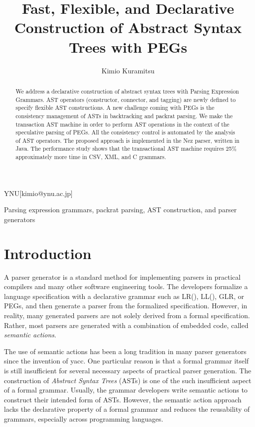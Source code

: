\documentclass[JIP]{ipsj}
\begin{document}
\title{Fast, Flexible, and Declarative Construction of Abstract Syntax Trees with PEGs}


\author{Kimio Kuramitsu}{YNU}[kimio@ynu.ac.jp]

\begin{abstract}
We address a declarative construction of abstract syntax trees with Parsing Expression Grammars. AST operators (constructor, connector, and tagging) are newly defined to specify flexible AST constructions. A new challenge coming with PEGs is the consistency management of ASTs in backtracking and packrat parsing. We make the transaction AST machine in order to perform AST operations in the context of the speculative parsing of PEGs. All the consistency control is automated by the analysis of AST operators. The proposed approach is implemented in the Nez parser, written in Java. The performance study shows that the transactional AST machine  requires 25\% approximately more time in CSV, XML, and C grammars.
\end{abstract}

\begin{keyword}
Parsing expression grammars, packrat parsing, AST construction, and parser generators
\end{keyword}

\maketitle



\section{Introduction}

A parser generator is a standard method for implementing parsers in practical compilers and many other software engineering tools. The developers formalize a language specification with a declarative grammar such as LR(), LL(), GLR, or PEGs\cite{POPL04_PEG}, and then generate a parser from the formalized specification. However, in reality, many generated parsers are not solely derived from a formal specification. Rather, most parsers are generated with a combination of embedded code, called {\em semantic actions}.

The use of semantic actions has been a long tradition in many parser generators since the invention of yacc\cite{Yacc}. 
One particular reason is that a formal grammar itself is still insufficient for several necessary aspects of practical parser generation. The construction of {\em Abstract Syntax Trees} (ASTs)  is one of the such insufficient aspect of a formal grammar. Usually, the grammar developers write semantic actions to construct their intended form of ASTs. However, the semantic action approach lacks the declarative property of a formal grammar and reduces the reusability of grammars, especially across programming languages.
\end{document}
